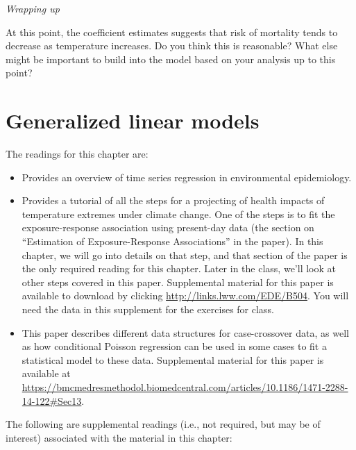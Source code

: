 \documentclass[
]{book}
\providecommand{\tightlist}{%
  \setlength{\itemsep}{0pt}\setlength{\parskip}{0pt}}
\begin{document}
\emph{Wrapping up}

At this point, the coefficient estimates suggests that risk of mortality
tends to decrease as temperature increases. Do you think this is reasonable?
What else might be important to build into the model based on your analysis
up to this point?

\hypertarget{generalized-linear-models}{%
\chapter{Generalized linear models}\label{generalized-linear-models}}

The readings for this chapter are:

\begin{itemize}
\tightlist
\item
  \citet{bhaskaran2013time} Provides an overview of time series regression
  in environmental epidemiology.
\item
  \citet{vicedo2019hands} Provides a tutorial of all the steps for a
  projecting of health impacts of temperature extremes under climate change.
  One of the steps is to fit the exposure-response association using present-day data
  (the section on ``Estimation of Exposure-Response Associations'' in the paper).
  In this chapter, we will go into details on that step, and that section of the paper
  is the only required reading for this chapter. Later in the class, we'll
  look at other steps covered in this paper. Supplemental material for this paper is
  available to download by
  clicking \url{http://links.lww.com/EDE/B504}. You will need the data in this supplement
  for the exercises for class.
\item
  \citet{armstrong2014conditional} This paper describes different data structures for
  case-crossover data, as well as how conditional Poisson regression can be used
  in some cases to fit a statistical model to these data.
  Supplemental material for this paper is available at
  \url{https://bmcmedresmethodol.biomedcentral.com/articles/10.1186/1471-2288-14-122\#Sec13}.
\end{itemize}

The following are supplemental readings (i.e., not required, but may be of
interest) associated with the material in this chapter:
\end{document}
